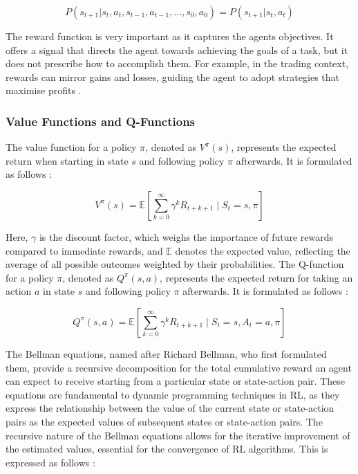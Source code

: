\begin{equation}
\label{Equation:MarkovProperty}
P(s_{t+1} | s_t, a_t, s_{t-1}, a_{t-1}, \ldots, s_0, a_0) = P(s_{t+1} | s_t, a_t)
\end{equation}

The reward function is very important as it captures the agents objectives. It offers a signal that directs the agent towards achieving the goals of a task, but it does not prescribe how to accomplish them. For example, in the trading context, rewards can mirror gains and losses, guiding the agent to adopt strategies that maximise profits \cite{sutton_reinforcement_2018}.

\subsubsection{Value Functions and Q-Functions}

The value function for a policy \( \pi \), denoted as \( V^\pi(s) \), represents the expected return when starting in state \( s \) and following policy \( \pi \) afterwards. It is formulated as follows \cite{sutton_reinforcement_2018}:

\begin{equation}
V^\pi(s) = \mathbb{E} \left[ \sum_{k=0}^{\infty} \gamma^k R_{t+k+1} \mid S_t = s, \pi \right]
\end{equation}

Here, \( \gamma \) is the discount factor, which weighs the importance of future rewards compared to immediate rewards, and \( \mathbb{E} \) denotes the expected value, reflecting the average of all possible outcomes weighted by their probabilities. The Q-function for a policy \( \pi \), denoted as \( Q^\pi(s, a) \), represents the expected return for taking an action \( a \) in state \( s \) and following policy \( \pi \) afterwards. It is formulated as follows \cite{sutton_reinforcement_2018}:

\begin{equation}
Q^\pi(s, a) = \mathbb{E} \left[ \sum_{k=0}^{\infty} \gamma^k R_{t+k+1} \mid S_t = s, A_t = a, \pi \right]
\end{equation}

The Bellman equations, named after Richard Bellman, who first formulated them, provide a recursive decomposition for the total cumulative reward an agent can expect to receive starting from a particular state or state-action pair. These equations are fundamental to dynamic programming techniques in RL, as they express the relationship between the value of the current state or state-action pairs as the expected values of subsequent states or state-action pairs. The recursive nature of the Bellman equations allows for the iterative improvement of the estimated values, essential for the convergence of RL algorithms. This is expressed as follows \cite{sutton_reinforcement_2018}:

